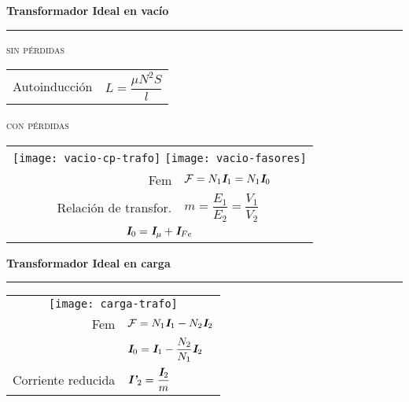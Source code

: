 \documentclass[11pt,a4paper]{article}
\newcommand{\fasor}[1]{\uppercase{\textit{\textbf{#1}}}}
\newcommand{\subtitulo}[1]{
    \textbf{#1} \\ \vspace{.1cm} {\color{gray} \hrule}
}
\begin{document}
    \begin{cajita}
        \centering
        \begin{center}
            \subtitulo{Transformador Ideal \textnormal{en vacío}}
        \end{center}
        \vspace{-.3cm} \textsc{sin pérdidas} \vspace{.1cm}

        \begin{tabular}{r l}
            Autoinducción & $L = \dfrac{\mu N^2 S}{l}$ \\
        \end{tabular} \vspace{.4cm}

        \textsc{con pérdidas} \vspace{.1cm}

        \begin{tabular}{r l}
            \multicolumn{2}{c}{\texttt{[image: vacio-cp-trafo]}  \texttt{[image: vacio-fasores]}} \\
            Fem & $\mathcal{F} = N_1  \fasor{i}_1  = N_1  \fasor{i}_0$\\
            Relación de transfor. & $m = \dfrac{E_1}{E_2} = \dfrac{V_1}{V_2}$ \\
            \multicolumn{2}{c}{$ \fasor{i}_0 = \fasor{i}_\mu + \fasor{i}_{Fe} $} \\
        \end{tabular}
        
        \begin{center}
            \subtitulo{Transformador Ideal \textnormal{en carga}}
        \end{center}
        \begin{tabular}{r l}
            \multicolumn{2}{c}{\texttt{[image: carga-trafo]}} \\
            Fem & $\mathcal{F} = N_1  \fasor{i}_1 - N_2 \fasor{i}_2$\\
            & $\fasor{i}_0 = \fasor{i}_1 - \dfrac{N_2}{N_1} \fasor{i}_2$\\
            Corriente reducida & $\fasor{i'}_2 = \dfrac{\fasor{i}_2}{m}$ \\
        \end{tabular}

    \end{cajita}
\end{document}
